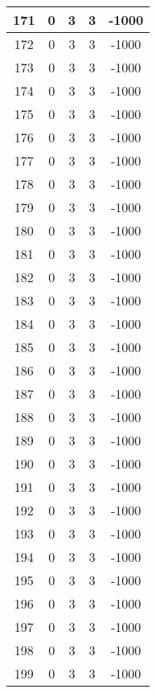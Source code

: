 \documentclass[letterpaper, 12pt]{article}
\begin{document}
\begin{longtable}{|c|c|c|c|c|}
\hline
171 & 0 & 3 & 3 & -1000 \\
\hline
172 & 0 & 3 & 3 & -1000 \\
\hline
173 & 0 & 3 & 3 & -1000 \\
\hline
174 & 0 & 3 & 3 & -1000 \\
\hline
175 & 0 & 3 & 3 & -1000 \\
\hline
176 & 0 & 3 & 3 & -1000 \\
\hline
177 & 0 & 3 & 3 & -1000 \\
\hline
178 & 0 & 3 & 3 & -1000 \\
\hline
179 & 0 & 3 & 3 & -1000 \\
\hline
180 & 0 & 3 & 3 & -1000 \\
\hline
181 & 0 & 3 & 3 & -1000 \\
\hline
182 & 0 & 3 & 3 & -1000 \\
\hline
183 & 0 & 3 & 3 & -1000 \\
\hline
184 & 0 & 3 & 3 & -1000 \\
\hline
185 & 0 & 3 & 3 & -1000 \\
\hline
186 & 0 & 3 & 3 & -1000 \\
\hline
187 & 0 & 3 & 3 & -1000 \\
\hline
188 & 0 & 3 & 3 & -1000 \\
\hline
189 & 0 & 3 & 3 & -1000 \\
\hline
190 & 0 & 3 & 3 & -1000 \\
\hline
191 & 0 & 3 & 3 & -1000 \\
\hline
192 & 0 & 3 & 3 & -1000 \\
\hline
193 & 0 & 3 & 3 & -1000 \\
\hline
194 & 0 & 3 & 3 & -1000 \\
\hline
195 & 0 & 3 & 3 & -1000 \\
\hline
196 & 0 & 3 & 3 & -1000 \\
\hline
197 & 0 & 3 & 3 & -1000 \\
\hline
198 & 0 & 3 & 3 & -1000 \\
\hline
199 & 0 & 3 & 3 & -1000 \\
\hline
\end{longtable}
\end{document}

